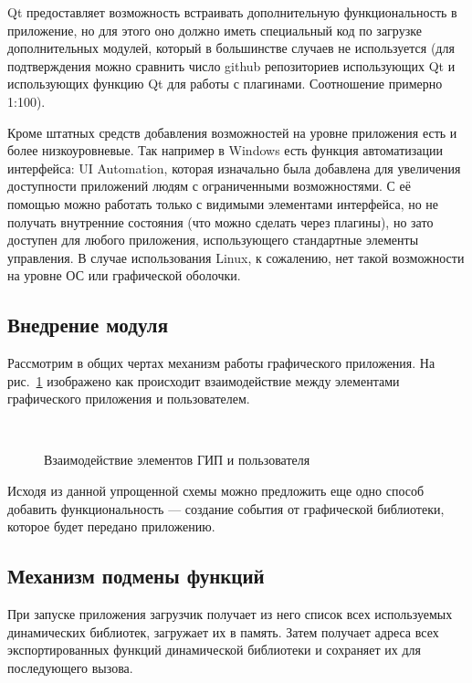 Qt предоставляет возможность встраивать дополнительную функциональность в
приложение, но для этого оно должно иметь специальный код по загрузке
дополнительных модулей, который в большинстве случаев не используется (для
подтверждения можно сравнить число github репозиториев использующих
Qt\cite{githubqt} и использующих функцию Qt для работы с
плагинами\cite{githubqpluginloader}. Соотношение примерно 1:100).

Кроме штатных средств добавления возможностей на уровне приложения есть и более
низкоуровневые. Так например в Windows есть функция автоматизации интерфейса: UI
Automation\cite{windowsuiautomation}, которая изначально была добавлена для
увеличения доступности приложений людям с ограниченными возможностями. С её
помощью можно работать только с видимыми элементами интерфейса, но не получать
внутренние состояния (что можно сделать через плагины), но зато доступен для
любого приложения, использующего стандартные элементы управления. В случае
использования Linux, к сожалению, нет такой возможности на уровне ОС или
графической оболочки.

\subsection{Внедрение модуля}

Рассмотрим в общих чертах механизм работы графического приложения. На
рис.~\ref{fig:gui} изображено как происходит взаимодействие между элементами
графического приложения и пользователем.

\begin{figure}
	\centering
	\\
	\caption{Взаимодействие элементов ГИП и пользователя}\label{fig:gui}
\end{figure}

Исходя из данной упрощенной схемы можно предложить еще одно способ добавить
функциональность — создание события от графической библиотеки, которое будет
передано приложению.

\subsection{Механизм подмены функций}

При запуске приложения загрузчик получает из него список всех используемых
динамических библиотек, загружает их в память. Затем получает адреса всех
экспортированных функций динамической библиотеки и сохраняет их для последующего
вызова.

